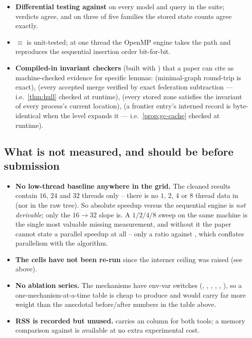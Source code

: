 \begin{itemize}[leftmargin=1.2em, itemsep=2pt]
\item \textbf{Differential testing against } on every model and
      query in the suite; verdicts agree, and on three of five families the
      stored state counts agree exactly.
\item \textbf{ $\equiv$ } is unit-tested; at one thread the
      OpenMP engine takes the  path and reproduces the sequential
      insertion order bit-for-bit.
\item \textbf{Compiled-in invariant checkers} (built with
      ) that a paper can cite as machine-checked
      evidence for specific lemmas:
       (minimal-graph round-trip is exact),
       (every accepted merge verified by exact federation
      subtraction --- i.e.\ \cref{thm:hull} checked at runtime),
       (every stored zone satisfies the invariant of every
      process's current location),
       (a frontier entry's interned record is byte-identical when
      the level expands it --- i.e.\ \cref{prop:gc-cache} checked at runtime).
\end{itemize}

\subsection{What is not measured, and should be before submission}

\begin{itemize}[leftmargin=1.2em, itemsep=2pt]
\item \textbf{No low-thread baseline anywhere in the grid.}  The cleaned
      results contain $16$, $24$ and $32$ threads only -- there is no $1$, $2$,
      $4$ or $8$ thread data in  (nor in the raw tree).
      So absolute speedup versus the sequential engine is \emph{not derivable};
      only the $16 \to 32$ slope is.  A $1/2/4/8$ sweep on the same machine is
      the single most valuable missing measurement, and without it the paper
      cannot state a parallel speedup at all -- only a ratio against
      , which conflates parallelism with the algorithm.
\item \textbf{The  cells have not been re-run} since the interner
      ceiling was raised (see above).
\item \textbf{No ablation series.}  The mechanisms have env-var switches
      (, , , ,
      , ), so a one-mechanism-at-a-time table is
      cheap to produce and would carry far more weight than the anecdotal
      before/after numbers in the table above.
\item \textbf{RSS is recorded but unused.}   carries an
       column for both tools; a memory comparison against
       is available at no extra experimental cost.
\end{itemize}
